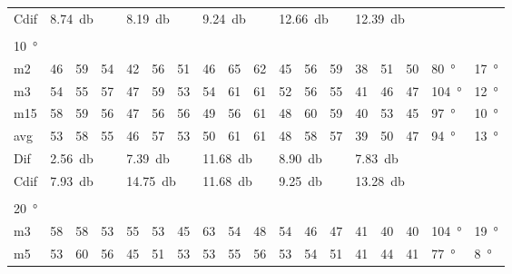 \begin{table}[H]
\begin{tabular}{l|l|l|l|l|l|l|l|l|l|l|l|l|l|l|l|l|l}
Cdif & \multicolumn{3}{l|}{\SI{8.74}{\decibel}} & \multicolumn{3}{l|}{\SI{8.19}{\decibel}} & \multicolumn{3}{l|}{\SI{9.24}{\decibel}} & \multicolumn{3}{l|}{\SI{12.66}{\decibel}} & \multicolumn{3}{l|}{\SI{12.39}{\decibel}}  &   \multicolumn{2}{l}{}   \\ 
 \multicolumn{18}{l}{ } \\                             
\SI{10}{\degree}   & \multicolumn{3}{l|}{} & \multicolumn{3}{l|}{} & \multicolumn{3}{l|}{} & \multicolumn{3}{l|}{} &  \multicolumn{3}{l|}{}   &  \multicolumn{2}{l}{} \\  \hline
m2    &  46    &  59    &  54    &  42    &  56    &   51   &  46    &   65    &   62   &   45    &  56    &  59    & 38 & 51 &50   & \SI{80}{\degree} & \SI{17}{\degree} \\
m3    &  54    &  55    &  57    &   47   &  59    &   53   &   54   &  61     &   61   &   52    & 56     &  55    & 41 & 46 &47  & \SI{104}{\degree} & \SI{12}{\degree} \\
m15  &  58    &  59    &  56    &  47    & 56     &   56   &   49   &   56    &   61   &    48   &   60   &  59    & 40 & 53 &45   & \SI{97}{\degree} & \SI{10}{\degree}\\ \hline
avg &  53    & 58     & 55     & 46     &   57   & 53     &  50    &  61     &  61    &  48     & 58     & 57     & 39 & 50 &  47 & \SI{94}{\degree} & \SI{13}{\degree} \\ \hline  
Dif & \multicolumn{3}{l|}{\SI{2.56}{\decibel}} & \multicolumn{3}{l|}{\SI{7.39}{\decibel}} & \multicolumn{3}{l|}{\SI{11.68}{\decibel}} & \multicolumn{3}{l|}{\SI{8.90}{\decibel}} & \multicolumn{3}{l|}{\SI{7.83}{\decibel}} &  \multicolumn{2}{l}{} \\     \hline 
Cdif & \multicolumn{3}{l|}{\SI{7.93}{\decibel}} & \multicolumn{3}{l|}{\SI{14.75}{\decibel}} & \multicolumn{3}{l|}{\SI{11.68}{\decibel}} & \multicolumn{3}{l|}{\SI{9.25}{\decibel}} & \multicolumn{3}{l|}{\SI{13.28}{\decibel}}  &   \multicolumn{2}{l}{}   \\  
\multicolumn{18}{l}{ } \\                
\SI{20}{\degree}   & \multicolumn{3}{l|}{} & \multicolumn{3}{l|}{} & \multicolumn{3}{l|}{} & \multicolumn{3}{l|}{} &  \multicolumn{3}{l|}{}   &  \multicolumn{2}{l}{} \\  \hline
m3    &  58    &  58    &  53    &  55    &  53    &  45    &   63   &    54   &  48    &  54     &  46    &  47    & 41 & 40 &40  & \SI{104}{\degree} & \SI{19}{\degree}  \\
m5    &  53    &  60    &  56    &  45    &  51    & 53     &   53   &  55     &  56    &  53     &  54    &   51   & 41 & 44 &41   & \SI{77}{\degree} & \SI{8}{\degree} \\

\end{tabular}
\end{table}
